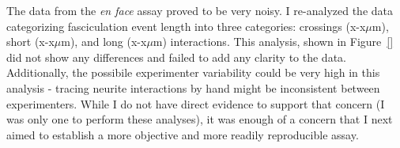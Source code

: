 
The data from the \emph{en face} assay proved to be very noisy.
I re-analyzed the data categorizing fasciculation event length into three categories: crossings (x-x$\mu$m), short (x-x$\mu$m), and long (x-x$\mu$m) interactions.
This analysis, shown in Figure~\ref{} did not show any differences and failed to add any clarity to the data.
Additionally, the possibile experimenter variability could be very high in this analysis - tracing neurite interactions by hand might be inconsistent between experimenters.
While I do not have direct evidence to support that concern (I was only one to perform these analyses), it was enough of a concern that I next aimed to establish a more objective and more readily reproducible assay.